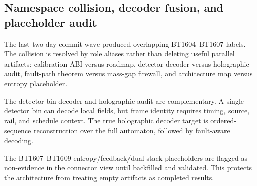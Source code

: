 \subsection{Namespace collision, decoder fusion, and placeholder audit}
\label{sec:bt1610-bt1612-namespace-decoder-backfill}

The last-two-day commit wave produced overlapping BT1604--BT1607 labels.  The collision is resolved by role aliases rather than deleting useful parallel artifacts: calibration ABI versus roadmap, detector decoder versus holographic audit, fault-path theorem versus mass-gap firewall, and architecture map versus entropy placeholder.

The detector-bin decoder and holographic audit are complementary.  A single detector bin can decode local fields, but frame identity requires timing, source, rail, and schedule context.  The true holographic decoder target is ordered-sequence reconstruction over the full automaton, followed by fault-aware decoding.

The BT1607--BT1609 entropy/feedback/dual-stack placeholders are flagged as non-evidence in the connector view until backfilled and validated.  This protects the architecture from treating empty artifacts as completed results.
